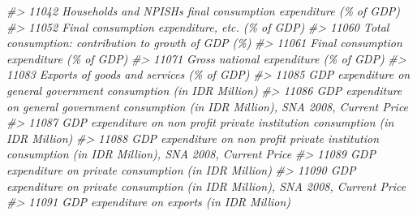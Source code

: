 \documentclass[
]{bxjsbook}
\newenvironment{Shaded}{\begin{snugshade}}{\end{snugshade}}
\newcommand{\CommentTok}[1]{\textcolor[rgb]{0.56,0.35,0.01}{\textit{#1}}}
\theoremstyle{definition}
\theoremstyle{definition}
\theoremstyle{definition}
\theoremstyle{definition}
\theoremstyle{remark}
\begin{document}
\begin{Shaded}
\begin{Highlighting}[]
\CommentTok{\#\textgreater{} 11042                                                                                                            Households and NPISHs final consumption expenditure (\% of GDP)}
\CommentTok{\#\textgreater{} 11052                                                                                                                            Final consumption expenditure, etc. (\% of GDP)}
\CommentTok{\#\textgreater{} 11060                                                                                                                      Total consumption: contribution to growth of GDP (\%)}
\CommentTok{\#\textgreater{} 11061                                                                                                                                  Final consumption expenditure (\% of GDP)}
\CommentTok{\#\textgreater{} 11071                                                                                                                                     Gross national expenditure (\% of GDP)}
\CommentTok{\#\textgreater{} 11083                                                                                                                                  Exports of goods and services (\% of GDP)}
\CommentTok{\#\textgreater{} 11085                                                                                                        GDP expenditure on general government consumption (in IDR Million)}
\CommentTok{\#\textgreater{} 11086                                                                               GDP expenditure on general government consumption (in IDR Million), SNA 2008, Current Price}
\CommentTok{\#\textgreater{} 11087                                                                                            GDP expenditure on non profit private institution consumption (in IDR Million)}
\CommentTok{\#\textgreater{} 11088                                                                   GDP expenditure on non profit private institution consumption (in IDR Million), SNA 2008, Current Price}
\CommentTok{\#\textgreater{} 11089                                                                                                                   GDP expenditure on private consumption (in IDR Million)}
\CommentTok{\#\textgreater{} 11090                                                                                          GDP expenditure on private consumption (in IDR Million), SNA 2008, Current Price}
\CommentTok{\#\textgreater{} 11091                                                                                                                               GDP expenditure on exports (in IDR Million)}

\end{Highlighting}
\end{Shaded}
\end{document}
